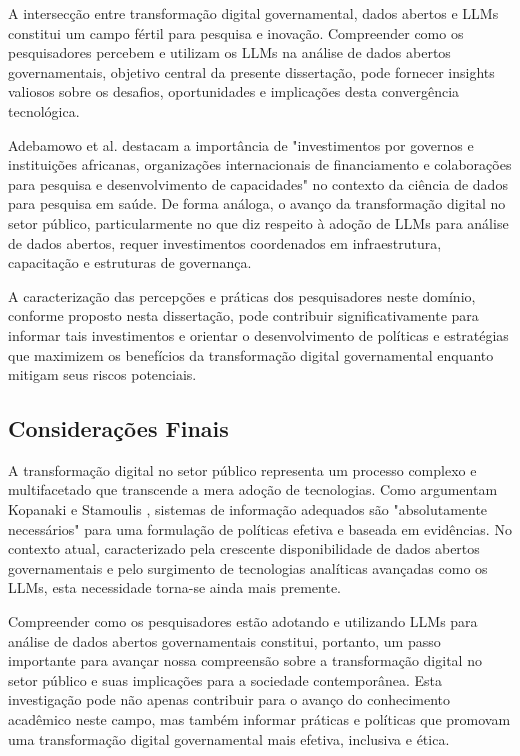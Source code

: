 A intersecção entre transformação digital governamental, dados abertos e LLMs constitui um campo fértil para pesquisa e inovação. Compreender como os pesquisadores percebem e utilizam os LLMs na análise de dados abertos governamentais, objetivo central da presente dissertação, pode fornecer insights valiosos sobre os desafios, oportunidades e implicações desta convergência tecnológica.

Adebamowo et al. \cite{Adebamowo2023} destacam a importância de "investimentos por governos e instituições africanas, organizações internacionais de financiamento e colaborações para pesquisa e desenvolvimento de capacidades" no contexto da ciência de dados para pesquisa em saúde. De forma análoga, o avanço da transformação digital no setor público, particularmente no que diz respeito à adoção de LLMs para análise de dados abertos, requer investimentos coordenados em infraestrutura, capacitação e estruturas de governança.

A caracterização das percepções e práticas dos pesquisadores neste domínio, conforme proposto nesta dissertação, pode contribuir significativamente para informar tais investimentos e orientar o desenvolvimento de políticas e estratégias que maximizem os benefícios da transformação digital governamental enquanto mitigam seus riscos potenciais.

\subsection{Considerações Finais}

A transformação digital no setor público representa um processo complexo e multifacetado que transcende a mera adoção de tecnologias. Como argumentam Kopanaki e Stamoulis \cite{ref_131}, sistemas de informação adequados são "absolutamente necessários" para uma formulação de políticas efetiva e baseada em evidências. No contexto atual, caracterizado pela crescente disponibilidade de dados abertos governamentais e pelo surgimento de tecnologias analíticas avançadas como os LLMs, esta necessidade torna-se ainda mais premente.

Compreender como os pesquisadores estão adotando e utilizando LLMs para análise de dados abertos governamentais constitui, portanto, um passo importante para avançar nossa compreensão sobre a transformação digital no setor público e suas implicações para a sociedade contemporânea. Esta investigação pode não apenas contribuir para o avanço do conhecimento acadêmico neste campo, mas também informar práticas e políticas que promovam uma transformação digital governamental mais efetiva, inclusiva e ética.



